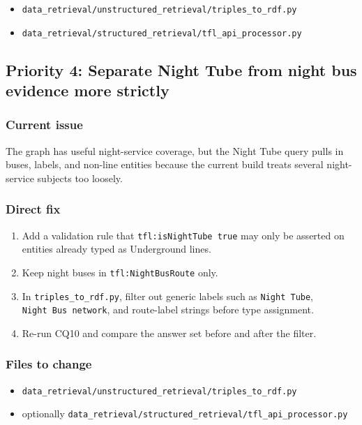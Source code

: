 \documentclass[
  11pt,
  a4paper,
]{article}
\providecommand{\tightlist}{%
  \setlength{\itemsep}{0pt}\setlength{\parskip}{0pt}}
\begin{document}
\begin{itemize}
\tightlist
\item
  \texttt{data\_retrieval/unstructured\_retrieval/triples\_to\_rdf.py}
\item
  \texttt{data\_retrieval/structured\_retrieval/tfl\_api\_processor.py}
\end{itemize}

\subsection{Priority 4: Separate Night Tube from night bus evidence more
strictly}\label{priority-4-separate-night-tube-from-night-bus-evidence-more-strictly}

\subsubsection{Current issue}\label{current-issue-3}

The graph has useful night-service coverage, but the Night Tube query
pulls in buses, labels, and non-line entities because the current build
treats several night-service subjects too loosely.

\subsubsection{Direct fix}\label{direct-fix-3}

\begin{enumerate}
\def\labelenumi{\arabic{enumi}.}
\tightlist
\item
  Add a validation rule that \texttt{tfl:isNightTube\ true} may only be
  asserted on entities already typed as Underground lines.
\item
  Keep night buses in \texttt{tfl:NightBusRoute} only.
\item
  In \texttt{triples\_to\_rdf.py}, filter out generic labels such as
  \texttt{Night\ Tube}, \texttt{Night\ Bus\ network}, and route-label
  strings before type assignment.
\item
  Re-run CQ10 and compare the answer set before and after the filter.
\end{enumerate}

\subsubsection{Files to change}\label{files-to-change-3}

\begin{itemize}
\tightlist
\item
  \texttt{data\_retrieval/unstructured\_retrieval/triples\_to\_rdf.py}
\item
  optionally
  \texttt{data\_retrieval/structured\_retrieval/tfl\_api\_processor.py}
\end{itemize}
\end{document}
